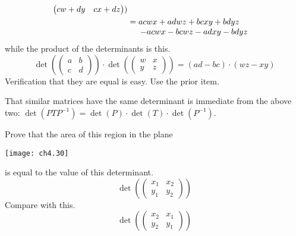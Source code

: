 \begin{exercises}
\begin{answer}
\begin{exparts}
\begin{align*}
\begin{pmatrix}
                 cw+dy  &cx+dz
              \end{pmatrix} )                 \\
             &=
             \begin{array}[t]{@{}l@{}} 
                 acwx+adwz+bcxy+bdyz  \\
                 \> -acwx-bcwz-adxy-bdyz
              \end{array}
          \end{align*}
          while the product of the determinants is this.
          \begin{equation*}
             \det(\begin{pmatrix}
                a  &b  \\
                c  &d
             \end{pmatrix})
             \cdot\det(\begin{pmatrix}
                w  &x  \\
                y  &z
             \end{pmatrix})
             =
             (ad-bc)\cdot (wz-xy)
          \end{equation*}
          Verification that they are equal is easy.
        \partsitem Use the prior item.
       \end{exparts}  
       \noindent That similar matrices have the same determinant 
       is immediate from the above two:
       $
          \det(PTP^{-1})=\det(P)\cdot\det(T)\cdot\det(P^{-1})
       $.
     \end{answer}
  \recommended \item
    Prove that the area of this region in the plane
    \begin{center}
      \texttt{[image: ch4.30]}
    \end{center}
    is equal to the value of this determinant.
    \begin{equation*}
       \det(
       \begin{pmatrix}
          x_1  &x_2  \\
          y_1  &y_2
       \end{pmatrix})
    \end{equation*}
    Compare with this.
    \begin{equation*}
       \det(
       \begin{pmatrix}
          x_2  &x_1  \\
          y_2  &y_1
       \end{pmatrix})
    \end{equation*}

\end{exercises}
